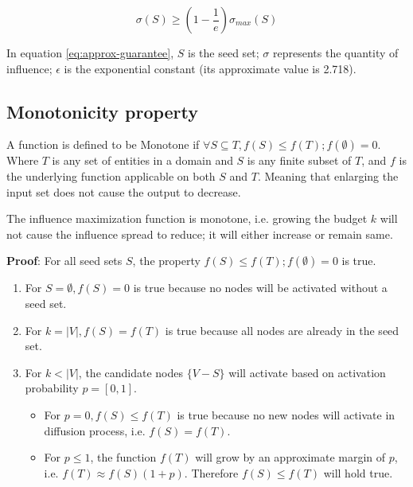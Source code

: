 		\begin{equation}
			\label{eq:approx-guarantee}
			\sigma(S)\geq (1-\frac{1}{e})\sigma_{max}(S)
		\end{equation}
	
		In equation \ref{eq:approx-guarantee}, $S$ is the seed set; $\sigma$ represents the quantity of influence; $\epsilon$ is the exponential constant (its approximate value is 2.718).

		\subsection{Monotonicity property}
		\label{sec:proof-monotone}
		A function is defined to be Monotone if $\forall S\subseteq T, f(S)\leq f(T);f(\emptyset)=0$. Where $T$ is any set of entities in a domain and $S$ is any finite subset of $T$, and $f$ is the underlying function applicable on both $S$ and $T$. Meaning that enlarging the input set does not cause the output to decrease.
		
		The influence maximization function is monotone, i.e. growing the budget $k$ will not cause the influence spread to reduce; it will either increase or remain same.
		
		\textbf{Proof}: For all seed sets $S$, the property $f(S)\leq f(T);f(\emptyset)=0$ is true.
	
		\begin{enumerate}
			\item For $S=\emptyset,f(S)=0$ is true because no nodes will be activated without a seed set.
			
			\item For $k=|V|,f(S)=f(T)$ is true because all nodes are already in the seed set.
			
			\item For $k<|V|$, the candidate nodes $\{V-S\}$ will activate based on activation probability $p=[0,1]$.
			
			\begin{itemize}
				\item For $p=0,f(S)\leq f(T)$ is true because no new nodes will activate in diffusion process, i.e. $f(S)=f(T)$.
				
				\item For $p\leq 1$, the function $f(T)$ will grow by an approximate margin of $p$, i.e. $f(T)\approx f(S)(1+p)$. Therefore $f(S)\leq f(T)$ will hold true.
			\end{itemize}
			
		\end{enumerate}

